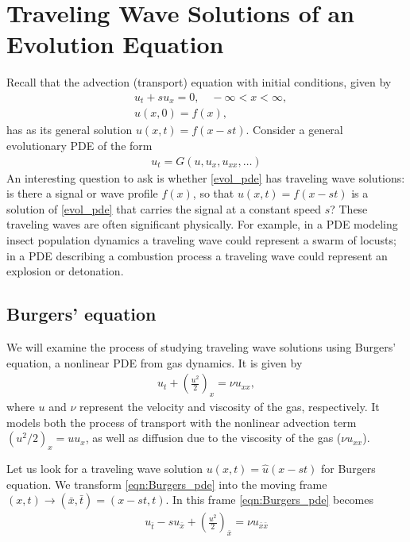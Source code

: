 \section*{Traveling Wave Solutions of an Evolution Equation}
Recall that the advection (transport) equation with initial conditions, given by
\begin{align*}
	&{ }u_t + su_x  = 0, \quad -\infty < x < \infty, \\
	&{ }u(x,0) = f(x),
\end{align*}
has as its general solution $u(x,t) = f(x -st)$.
Consider a general evolutionary PDE of the form
\begin{align}
u_t = G(u,u_x, u_{xx}, \ldots)
\label{evol_pde}
\end{align}
An interesting question to ask is whether \eqref{evol_pde} has traveling wave solutions: is there a signal or wave profile $f(x)$, so that $u(x,t) = f(x-st)$ is a solution of \eqref{evol_pde} that carries the signal at a constant speed $s$?
These traveling waves are often significant physically.
For example, in a PDE modeling insect population dynamics a traveling wave could represent a swarm of locusts; in a PDE describing a combustion process a traveling wave could represent an explosion or detonation.

\subsection*{Burgers' equation}
We will examine the process of studying traveling wave solutions using Burgers' equation, a nonlinear PDE from gas dynamics.
It is given by
\begin{align}
	u_t + \left( \frac{u^2}{2} \right)_x = \nu u_{xx}, \label{eqn:Burgers_pde}
\end{align}
where $u$ and $\nu$ represent the velocity and viscosity of the gas, respectively.
It models both the process of transport with the nonlinear advection term $(u^2/2)_x = u u_x$, as well as diffusion due to the viscosity of the gas ($\nu u_{xx}$).

Let us look for a traveling wave solution $u(x,t) = \hat{u}(x-st)$ for Burgers equation.
We transform \eqref{eqn:Burgers_pde} into the moving frame $(x,t) \to (\bar{x},\bar{t}) = (x-st, t)$. In this frame \eqref{eqn:Burgers_pde} becomes
\begin{align}
	u_{\bar{t}} - s u_{\bar{x}}+ \left(\frac{u^2}{2} \right)_{\bar{x}} = \nu u_{\bar{x}\bar{x}}
	\label{eqn:Burgers_pde_moving_frame}
\end{align}


